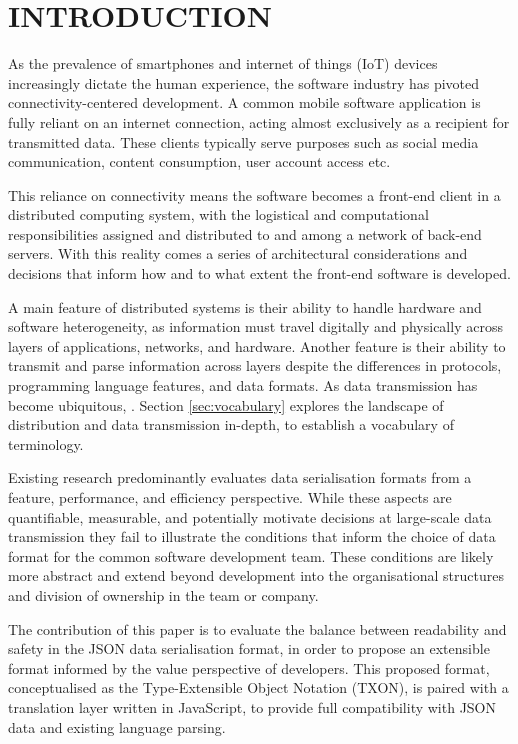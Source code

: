 \documentclass[../report.tex]{subfiles}
\begin{document}
\section{INTRODUCTION}

As the prevalence of smartphones and internet of things (IoT) devices increasingly dictate the human experience, the software industry has pivoted connectivity-centered development. A common mobile software application is fully reliant on an internet connection, acting almost exclusively as a recipient for transmitted data. These clients typically serve purposes such as social media communication, content consumption, user account access etc.

This reliance on connectivity means the software becomes a front-end client in a distributed computing system, with the logistical and computational responsibilities assigned and distributed to and among a network of back-end servers. With this reality comes a series of architectural considerations and decisions that inform how and to what extent the front-end software is developed.

A main feature of distributed systems is their ability to handle hardware and software heterogeneity, as information must travel digitally and physically across layers of applications, networks, and hardware. Another feature is their ability to transmit and parse information across layers despite the differences in protocols, programming language features, and data formats. As data transmission has become ubiquitous, . Section \ref{sec:vocabulary} explores the landscape of distribution and data transmission in-depth, to establish a vocabulary of terminology.

Existing research predominantly evaluates data serialisation formats from a feature, performance, and efficiency perspective. While these aspects are quantifiable, measurable, and potentially motivate decisions at large-scale data transmission they fail to illustrate the conditions that inform the choice of data format for the common software development team. These conditions are likely more abstract and extend beyond development into the organisational structures and division of ownership in the team or company.

The contribution of this paper is to evaluate the balance between readability and safety in the JSON data serialisation format, in order to propose an extensible format informed by the value perspective of developers. This proposed format, conceptualised as the Type-Extensible Object Notation (TXON), is paired with a translation layer written in JavaScript, to provide full compatibility with JSON data and existing language parsing.
\end{document}
